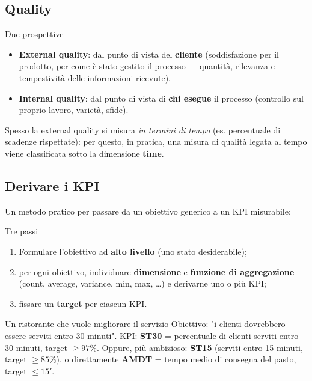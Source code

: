 \subsection{\texorpdfstring{Quality}{Quality}}

\begin{boxnote}{Due prospettive}
\begin{itemize}
\item \textbf{External quality}: dal punto di vista del \textbf{cliente} (soddisfazione per il prodotto, per come è stato gestito il processo — quantità, rilevanza e tempestività delle informazioni ricevute).
\item \textbf{Internal quality}: dal punto di vista di \textbf{chi esegue} il processo (controllo sul proprio lavoro, varietà, sfide).
\end{itemize}

Spesso la external quality si misura \emph{in termini di tempo} (es. percentuale di scadenze rispettate): per questo, in pratica, una misura di qualità legata al tempo viene classificata sotto la dimensione \textbf{time}.
\end{boxnote}

\subsection{\texorpdfstring{Derivare i KPI}{Derivare i KPI}}

Un metodo pratico per passare da un obiettivo generico a un KPI misurabile:

\begin{boxnote}{Tre passi}
\begin{enumerate}
\item Formulare l'obiettivo ad \textbf{alto livello} (uno stato desiderabile);
\item per ogni obiettivo, individuare \textbf{dimensione} e \textbf{funzione di aggregazione} (count, average, variance, min, max, …) e derivarne uno o più KPI;
\item fissare un \textbf{target} per ciascun KPI.
\end{enumerate}
\end{boxnote}

\begin{boxexample}{Un ristorante che vuole migliorare il servizio}
Obiettivo: "i clienti dovrebbero essere serviti entro 30 minuti". KPI: \textbf{ST30} = percentuale di clienti serviti entro 30 minuti, target $\ge 97\%$. Oppure, più ambizioso: \textbf{ST15} (serviti entro 15 minuti, target $\ge 85\%$), o direttamente \textbf{AMDT} = tempo medio di consegna del pasto, target $\le 15'$.
\end{boxexample}

